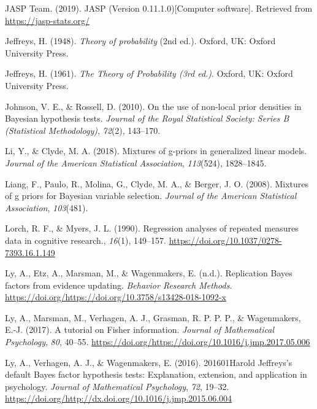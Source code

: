 \documentclass[english,,doc,floatsintext]{apa6}
\begin{document}
\leavevmode\hypertarget{ref-jaspSoftware}{}%
JASP Team. (2019). JASP (Version 0.11.1.0){[}Computer software{]}. Retrieved from \url{https://jasp-stats.org/}

\leavevmode\hypertarget{ref-jeffreys1948theory2}{}%
Jeffreys, H. (1948). \emph{Theory of probability} (2nd ed.). Oxford, UK: Oxford University Press.

\leavevmode\hypertarget{ref-jeffreys1961}{}%
Jeffreys, H. (1961). \emph{The Theory of Probability (3rd ed.)}. Oxford, UK: Oxford University Press.

\leavevmode\hypertarget{ref-johnson2010use}{}%
Johnson, V. E., \& Rossell, D. (2010). On the use of non-local prior densities in Bayesian hypothesis tests. \emph{Journal of the Royal Statistical Society: Series B (Statistical Methodology)}, \emph{72}(2), 143--170.

\leavevmode\hypertarget{ref-li2018mixtures}{}%
Li, Y., \& Clyde, M. A. (2018). Mixtures of g-priors in generalized linear models. \emph{Journal of the American Statistical Association}, \emph{113}(524), 1828--1845.

\leavevmode\hypertarget{ref-liang2008mixtures}{}%
Liang, F., Paulo, R., Molina, G., Clyde, M. A., \& Berger, J. O. (2008). Mixtures of g priors for Bayesian variable selection. \emph{Journal of the American Statistical Association}, \emph{103}(481).

\leavevmode\hypertarget{ref-lorch1990}{}%
Lorch, R. F., \& Myers, J. L. (1990). Regression analyses of repeated measures data in cognitive research., \emph{16}(1), 149--157. \url{https://doi.org/10.1037/0278-7393.16.1.149}

\leavevmode\hypertarget{ref-ly2017replication}{}%
Ly, A., Etz, A., Marsman, M., \& Wagenmakers, E. (n.d.). Replication Bayes factors from evidence updating. \emph{Behavior Research Methods}. \url{https://doi.org/https://doi.org/10.3758/s13428-018-1092-x}

\leavevmode\hypertarget{ref-ly2017tutorial}{}%
Ly, A., Marsman, M., Verhagen, A. J., Grasman, R. P. P. P., \& Wagenmakers, E.-J. (2017). A tutorial on Fisher information. \emph{Journal of Mathematical Psychology}, \emph{80}, 40--55. \url{https://doi.org/https://doi.org/10.1016/j.jmp.2017.05.006}

\leavevmode\hypertarget{ref-ly2016harold}{}%
Ly, A., Verhagen, A. J., \& Wagenmakers, E. (2016). 201601Harold Jeffreys's default Bayes factor hypothesis tests: Explanation, extension, and application in psychology. \emph{Journal of Mathematical Psychology}, \emph{72}, 19--32. \url{https://doi.org/http://dx.doi.org/10.1016/j.jmp.2015.06.004}
\end{document}
